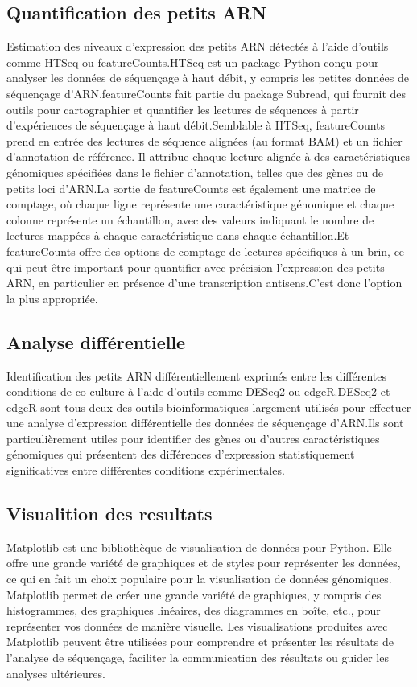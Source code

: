 \documentclass{report}
\begin{document}
\subsection{Quantification des petits ARN }
Estimation des niveaux d'expression des petits ARN détectés à l'aide d'outils comme HTSeq\cite{anders2015htseq} ou featureCounts\cite{liao2014featurecounts}.HTSeq est un package Python conçu pour analyser les données de séquençage à haut débit, y compris les petites données de séquençage d'ARN.featureCounts fait partie du package Subread, qui fournit des outils pour cartographier et quantifier les lectures de séquences à partir d'expériences de séquençage à haut débit.Semblable à HTSeq, featureCounts prend en entrée des lectures de séquence alignées (au format BAM) et un fichier d'annotation de référence. Il attribue chaque lecture alignée à des caractéristiques génomiques spécifiées dans le fichier d'annotation, telles que des gènes ou de petits loci d'ARN.La sortie de featureCounts est également une matrice de comptage, où chaque ligne représente une caractéristique génomique et chaque colonne représente un échantillon, avec des valeurs indiquant le nombre de lectures mappées à chaque caractéristique dans chaque échantillon.Et featureCounts offre des options de comptage de lectures spécifiques à un brin, ce qui peut être important pour quantifier avec précision l'expression des petits ARN, en particulier en présence d'une transcription antisens.C’est donc l’option la plus appropriée.

\subsection{Analyse différentielle}
Identification des petits ARN différentiellement exprimés entre les différentes conditions de co-culture à l'aide d'outils comme DESeq2 \cite{love2014moderated} ou edgeR\cite{robinson2010edger}.DESeq2 et edgeR sont tous deux des outils bioinformatiques largement utilisés pour effectuer une analyse d’expression différentielle des données de séquençage d’ARN.Ils sont particulièrement utiles pour identifier des gènes ou d’autres caractéristiques génomiques qui présentent des différences d’expression statistiquement significatives entre différentes conditions expérimentales.

\subsection{Visualition des resultats}
Matplotlib est une bibliothèque de visualisation de données pour Python. Elle offre une grande variété de graphiques et de styles pour représenter les données, ce qui en fait un choix populaire pour la visualisation de données génomiques. Matplotlib permet de créer une grande variété de graphiques, y compris des histogrammes, des graphiques linéaires, des diagrammes en boîte, etc., pour représenter vos données de manière visuelle. Les visualisations produites avec Matplotlib peuvent être utilisées pour comprendre et présenter les résultats de l'analyse de séquençage, faciliter la communication des résultats ou guider les analyses ultérieures.\\
\end{document}
